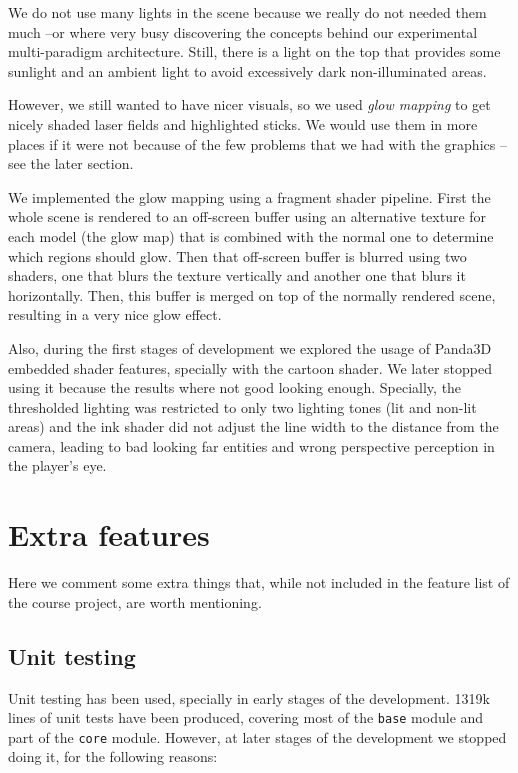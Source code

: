 \documentclass[a4paper,10pt]{article}
\begin{document}
We do not use many lights in the scene because we really do not needed
them much --or where very busy discovering the concepts behind our
experimental multi-paradigm architecture. Still, there is a light
on the top that provides some sunlight and an ambient light to avoid
excessively dark non-illuminated areas.

However, we still wanted to have nicer visuals, so we used \emph{glow
  mapping} to get nicely shaded laser fields and highlighted
sticks. We would use them in more places if it were not because of the
few problems that we had with the graphics --see the later section.

We implemented the glow mapping using a fragment shader
pipeline. First the whole scene is rendered to an off-screen buffer
using an alternative texture for each model (the glow map) that is combined with the normal one to
determine which regions should glow. Then that off-screen buffer is
blurred using two shaders, one that blurs the texture vertically and
another one that blurs it horizontally. Then, this buffer is merged on
top of the normally rendered scene, resulting in a very nice glow
effect.

Also, during the first stages of development we explored the usage of
Panda3D embedded shader features, specially with the cartoon
shader. We later stopped using it because the results where not good
looking enough. Specially, the thresholded lighting was restricted to
only two lighting tones (lit and non-lit areas) and the ink shader did
not adjust the line width to the distance from the camera, leading to
bad looking far entities and wrong perspective perception in the
player's eye.

\section{Extra features}

Here we comment some extra things that, while not included in the
feature list of the course project, are worth mentioning.

\subsection{Unit testing}

Unit testing has been used, specially in early stages of the
development. 1319k lines of unit tests have been produced, covering
most of the \texttt{base} module and part of the \texttt{core}
module. However, at later stages of the development we stopped doing
it, for the following reasons:
\end{document}
